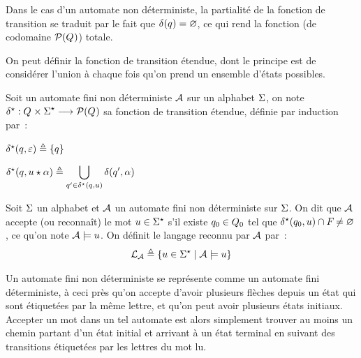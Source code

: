 \begin{remark}
  Dans le cas d'un automate non déterministe, la partialité de la fonction de
  transition se traduit par le fait que $\delta_{}(q_{}) = \varnothing$, ce qui rend la
  fonction (de codomaine $\mathcal{P}(Q_{})$) totale.
\end{remark}

On peut définir la fonction de transition étendue, dont le principe est de
considérer l'union à chaque fois qu'on prend un ensemble d'états possibles.

\begin{definition}
  Soit un automate fini non déterministe $\mathcal{A}$ sur un alphabet $\Sigma$,
  on note $\delta_{}^{\star} : \displaystyle Q_{} \times \Sigma^{\star} \longrightarrow \mathcal{P}(Q_{})$ sa
  fonction de transition étendue, définie par induction par~:
  \vspace{0.1cm}
  \begin{itemize}
    \begin{minipage}{0.45\textwidth}
    \item $\delta_{}^{\star}(q_{},\varepsilon) \triangleq \{q_{}\}$
    \end{minipage}
    \begin{minipage}{0.45\textwidth}
    \item $\displaystyle\delta_{}^{\star}(q_{},u\mathbin{\star}\alpha) \triangleq
      \bigcup_{q_{}' \in \delta_{}^{\star}(q_{},u)} \delta_{}(q_{}',\alpha)$
    \end{minipage}
  \end{itemize}
\end{definition}

\begin{definition}
  Soit $\Sigma$ un alphabet et $\mathcal{A}$ un automate fini non déterministe sur
  $\Sigma$. On dit que $\mathcal{A}$ accepte (ou reconnaît) le mot $u\in\Sigma^{\star}$
  s'il existe $q_{0} \in Q_{0}$ tel que
  $\delta_{}^{\star}(q_{0},u) \cap F_{}\neq\varnothing$, ce qu'on note
  $\mathcal{A} \models u$.
  On définit le langage reconnu par $\mathcal{A}$ par~:
  \[\mathcal L_{\mathcal{A}}\triangleq \left\{ u \in \Sigma^{\star} \;\middle\vert\; \mathcal{A} \models u \right\}\]
\end{definition}

Un automate fini non déterministe se représente comme un automate fini
déterministe, à ceci près qu'on accepte d'avoir plusieurs flèches depuis un
état qui sont étiquetées par la même lettre, et qu'on peut avoir plusieurs
états initiaux. Accepter un mot dans un tel automate est alors simplement
trouver au moins un chemin partant d'un état initial et arrivant à un état
terminal en suivant des transitions étiquetées par les lettres du mot lu.

